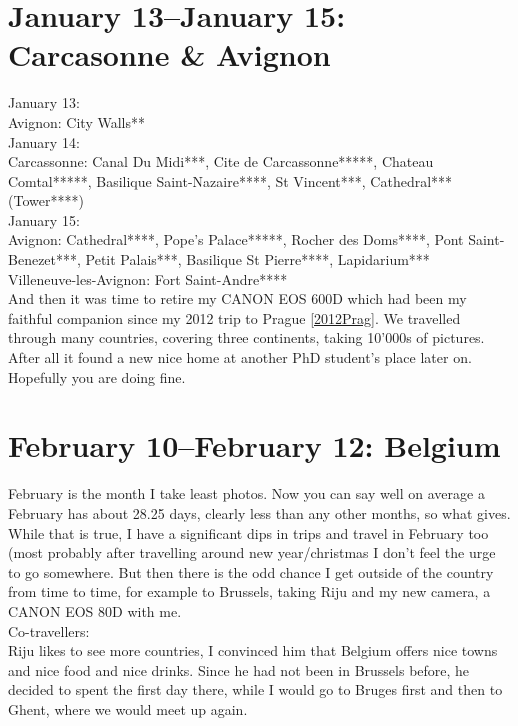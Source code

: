 \section{January 13--January 15: Carcasonne \& Avignon}
\label{2017:Provence}

January 13:\\
Avignon: City Walls**\\

January 14:\\
Carcassonne: Canal Du Midi***, Cite de Carcassonne*****, Chateau Comtal*****, Basilique Saint-Nazaire****, St Vincent***, Cathedral*** (Tower****)\\

January 15:\\
Avignon: Cathedral****, Pope's Palace*****, Rocher des Doms****, Pont Saint-Benezet***, Petit Palais***, Basilique St Pierre****, Lapidarium***\\
Villeneuve-les-Avignon: Fort Saint-Andre****\\

And then it was time to retire my CANON EOS 600D which had been my faithful companion since my 2012 trip to Prague \ref{2012Prag}. We travelled through many countries, covering three continents, taking 10'000s of pictures. After all it found a new nice home at another PhD student's place later on. Hopefully you are doing fine. 

\section{February 10--February 12: Belgium}
\label{Belgium2017}

February is the month I take least photos. Now you can say well on average a February has about 28.25 days, clearly less than any other months, so what gives. While that is true, I have a significant dips in trips and travel in February too (most probably after travelling around new year/christmas I don't feel the urge to go somewhere. But then there is the odd chance I get outside of the country from time to time, for example to Brussels, taking Riju and my new camera, a CANON EOS 80D with me.\\

Co-travellers:\\
Riju likes to see more countries, I convinced him that Belgium offers nice towns and nice food and nice drinks. Since he had not been in Brussels before, he decided to spent the first day there, while I would go to Bruges first and then to Ghent, where we would meet up again.\\

